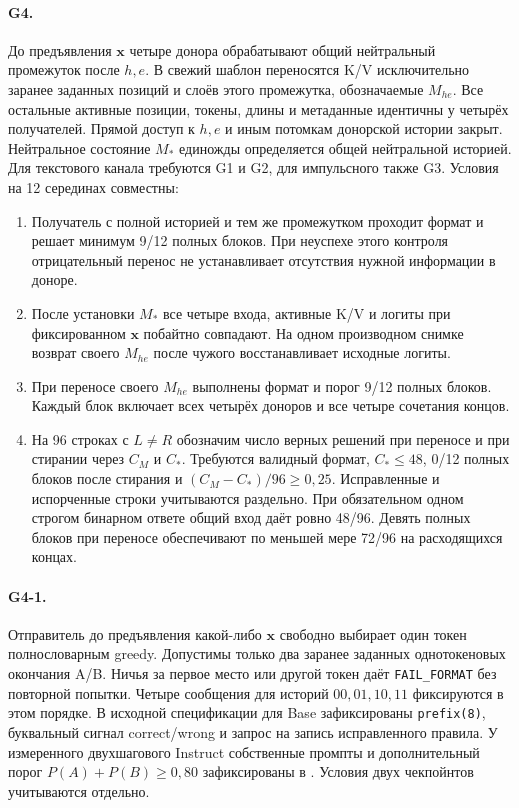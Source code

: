 \paragraph{G4.}
До предъявления $\mathbf{x}$ четыре донора обрабатывают общий нейтральный
промежуток после $h,e$. В свежий шаблон переносятся K/V исключительно
заранее заданных позиций и слоёв этого промежутка, обозначаемые $M_{he}$.
Все остальные активные позиции, токены, длины и метаданные идентичны у
четырёх получателей. Прямой доступ к $h,e$ и иным потомкам донорской
истории закрыт. Нейтральное состояние $M_*$ единожды определяется общей
нейтральной историей. Для текстового канала требуются G1 и G2, для
импульсного также G3. Условия на 12 серединах совместны:
\begin{enumerate}
\item Получатель с полной историей и тем же промежутком проходит формат и
решает минимум 9/12 полных блоков. При неуспехе этого контроля отрицательный
перенос не устанавливает отсутствия нужной информации в доноре.
\item После установки $M_*$ все четыре входа, активные K/V и логиты при
фиксированном $\mathbf{x}$ побайтно совпадают. На одном производном снимке
возврат своего $M_{he}$ после чужого восстанавливает исходные логиты.
\item При переносе своего $M_{he}$ выполнены формат и порог 9/12 полных
блоков. Каждый блок включает всех четырёх доноров и все четыре сочетания
концов.
\item На 96 строках с $L\ne R$ обозначим число верных решений при переносе
и при стирании через $C_M$ и $C_*$. Требуются валидный формат,
$C_*\le48$, 0/12 полных блоков после стирания и
$(C_M-C_*)/96\ge 0{,}25$. Исправленные и испорченные строки учитываются
раздельно. При обязательном одном строгом бинарном ответе общий вход даёт
ровно 48/96. Девять полных блоков при переносе обеспечивают по меньшей
мере 72/96 на расходящихся концах.
\end{enumerate}

\paragraph{G4-1.}
Отправитель до предъявления какой-либо $\mathbf{x}$ свободно выбирает один
токен полнословарным greedy. Допустимы только два заранее заданных
однотокеновых окончания A/B. Ничья за первое место или другой токен даёт
\texttt{FAIL\_FORMAT} без повторной попытки. Четыре сообщения для историй
$00,01,10,11$ фиксируются в этом порядке. В исходной спецификации для Base
зафиксированы \texttt{prefix(8)}, буквальный сигнал correct/wrong и запрос
на запись исправленного правила. У измеренного двухшагового Instruct
собственные промпты и дополнительный порог $P(A)+P(B)\ge0{,}80$
зафиксированы в .
Условия двух чекпойнтов учитываются отдельно.

